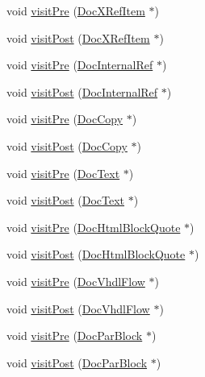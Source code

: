 \begin{DoxyCompactItemize}
\item 
void \hyperlink{class_perl_mod_doc_visitor_a11554deeaf3e631a297b8e2091aaff97}{visit\+Pre} (\hyperlink{class_doc_x_ref_item}{Doc\+X\+Ref\+Item} $\ast$)
\item 
void \hyperlink{class_perl_mod_doc_visitor_a7b3c671c16b385f1497890446b0b8777}{visit\+Post} (\hyperlink{class_doc_x_ref_item}{Doc\+X\+Ref\+Item} $\ast$)
\item 
void \hyperlink{class_perl_mod_doc_visitor_a0df067037cffd3516ca6d453a0f6e989}{visit\+Pre} (\hyperlink{class_doc_internal_ref}{Doc\+Internal\+Ref} $\ast$)
\item 
void \hyperlink{class_perl_mod_doc_visitor_a24f70910b80988c8991eab2a5c3acb48}{visit\+Post} (\hyperlink{class_doc_internal_ref}{Doc\+Internal\+Ref} $\ast$)
\item 
void \hyperlink{class_perl_mod_doc_visitor_a769f0078bded952ed3ef6bb0fe224452}{visit\+Pre} (\hyperlink{class_doc_copy}{Doc\+Copy} $\ast$)
\item 
void \hyperlink{class_perl_mod_doc_visitor_a170f73e5397179cff3136417d1dfaf7e}{visit\+Post} (\hyperlink{class_doc_copy}{Doc\+Copy} $\ast$)
\item 
void \hyperlink{class_perl_mod_doc_visitor_a41b7d6baa3f54d17707099219e73873d}{visit\+Pre} (\hyperlink{class_doc_text}{Doc\+Text} $\ast$)
\item 
void \hyperlink{class_perl_mod_doc_visitor_a0bb72a51b519a2dea2930de3baa06a68}{visit\+Post} (\hyperlink{class_doc_text}{Doc\+Text} $\ast$)
\item 
void \hyperlink{class_perl_mod_doc_visitor_afe509dcb9784d42be53c581f3e5dfebd}{visit\+Pre} (\hyperlink{class_doc_html_block_quote}{Doc\+Html\+Block\+Quote} $\ast$)
\item 
void \hyperlink{class_perl_mod_doc_visitor_a3faf431729cf9a368bceb3fb7e2382e7}{visit\+Post} (\hyperlink{class_doc_html_block_quote}{Doc\+Html\+Block\+Quote} $\ast$)
\item 
void \hyperlink{class_perl_mod_doc_visitor_abe7e71d4b2d45f7988f9c48d7ab9c191}{visit\+Pre} (\hyperlink{class_doc_vhdl_flow}{Doc\+Vhdl\+Flow} $\ast$)
\item 
void \hyperlink{class_perl_mod_doc_visitor_ac7c692999a03dc8ab8c9306cb256e0ec}{visit\+Post} (\hyperlink{class_doc_vhdl_flow}{Doc\+Vhdl\+Flow} $\ast$)
\item 
void \hyperlink{class_perl_mod_doc_visitor_ac1ba7699b4888a726a3afdf1ba71e9a4}{visit\+Pre} (\hyperlink{class_doc_par_block}{Doc\+Par\+Block} $\ast$)
\item 
void \hyperlink{class_perl_mod_doc_visitor_a4fd19386e80be754e3d57fc809ed52f9}{visit\+Post} (\hyperlink{class_doc_par_block}{Doc\+Par\+Block} $\ast$)
\end{DoxyCompactItemize}


